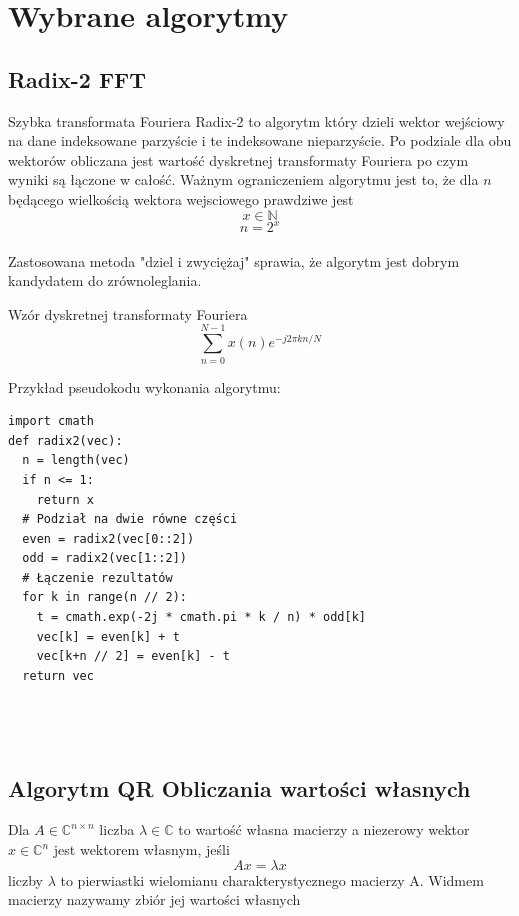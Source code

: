 \documentclass[11pt]{beamer}
\begin{document}
\section{Wybrane algorytmy}
\begin{frame}
	\begin{center}
	\insertsectionhead\par%
	\end{center}
\end{frame}

\subsection{Radix-2 FFT}
\begin{frame}{\subsecname}
	Szybka transformata Fouriera Radix-2 to algorytm który dzieli wektor wejściowy na dane indeksowane parzyście i te indeksowane nieparzyście. Po podziale dla obu wektorów obliczana jest wartość dyskretnej transformaty Fouriera po czym wyniki są łączone w całość. Ważnym ograniczeniem algorytmu jest to, że dla $n$ będącego wielkością wektora wejsciowego prawdziwe jest $$x \in \mathbb{N}$$ $$n = 2^x$$ \\
	Zastosowana metoda "dziel i zwyciężaj" sprawia, że algorytm jest dobrym kandydatem do zrównoleglania.
\end{frame}

\begin{frame}{\subsecname}
Wzór dyskretnej transformaty Fouriera
$$\sum_{n=0}^{N-1}{x(n)e^{-j2\pi kn/N}}$$
\end{frame}

\begin{frame}[containsverbatim]{\subsecname}
	\begin{exampleblock}{Przykład pseudokodu wykonania algorytmu:}
	\end{exampleblock}
\begin{verbatim}
import cmath
def radix2(vec):
  n = length(vec)
  if n <= 1:
	return x
  # Podział na dwie równe części	
  even = radix2(vec[0::2])
  odd = radix2(vec[1::2])
  # Łączenie rezultatów
  for k in range(n // 2):
	t = cmath.exp(-2j * cmath.pi * k / n) * odd[k]
	vec[k] = even[k] + t
	vec[k+n // 2] = even[k] - t
  return vec
		
	
	
\end{verbatim}
\end{frame}

\subsection{Algorytm QR Obliczania wartości własnych}
\begin{frame}{\subsecname}
	Dla $A \in \mathbb{C}^{n\times n}$ liczba $\lambda \in \mathbb{C}$ to wartość własna macierzy a niezerowy wektor $x \in \mathbb{C}^n$ jest wektorem własnym, jeśli $$Ax = \lambda x$$
liczby $\lambda$ to pierwiastki wielomianu charakterystycznego macierzy A.	Widmem macierzy nazywamy zbiór jej wartości własnych

\end{frame}
\end{document}
